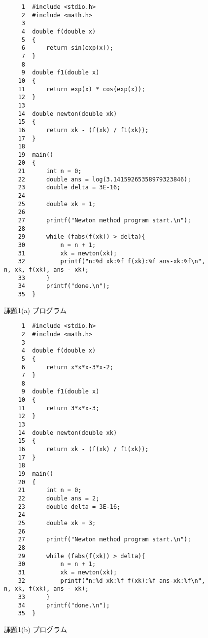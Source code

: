 \documentclass[12pt]{jarticle}
\begin{document}

\begin{figure}[t]
\begin{screen}
\footnotesize
\begin{verbatim}
     1	#include <stdio.h>
     2	#include <math.h> 
     3	
     4	double f(double x)
     5	{
     6	    return sin(exp(x));
     7	}
     8	
     9	double f1(double x)
    10	{
    11	    return exp(x) * cos(exp(x));
    12	}
    13	
    14	double newton(double xk)
    15	{
    16	    return xk - (f(xk) / f1(xk));
    17	}
    18	
    19	main()
    20	{
    21	    int n = 0;
    22	    double ans = log(3.14159265358979323846);
    23	    double delta = 3E-16;
    24	
    25	    double xk = 1;
    26	
    27	    printf("Newton method program start.\n");
    28	
    29	    while (fabs(f(xk)) > delta){
    30	        n = n + 1;
    31	        xk = newton(xk);
    32	        printf("n:%d xk:%f f(xk):%f ans-xk:%f\n", n, xk, f(xk), ans - xk);
    33	    }
    34	    printf("done.\n");
    35	}
\end{verbatim}
\end{screen}
\caption{課題1(a) プログラム}
\label{fig:p1a}
\end{figure}

\begin{figure}[t]
\begin{screen}
\footnotesize
\begin{verbatim}
     1	#include <stdio.h>
     2	#include <math.h> 
     3	
     4	double f(double x)
     5	{
     6	    return x*x*x-3*x-2;
     7	}
     8	
     9	double f1(double x)
    10	{
    11	    return 3*x*x-3;
    12	}
    13	
    14	double newton(double xk)
    15	{
    16	    return xk - (f(xk) / f1(xk));
    17	}
    18	
    19	main()
    20	{
    21	    int n = 0;
    22	    double ans = 2;
    23	    double delta = 3E-16;
    24	
    25	    double xk = 3;
    26	
    27	    printf("Newton method program start.\n");
    28	
    29	    while (fabs(f(xk)) > delta){
    30	        n = n + 1;
    31	        xk = newton(xk);
    32	        printf("n:%d xk:%f f(xk):%f ans-xk:%f\n", n, xk, f(xk), ans - xk);
    33	    }
    34	    printf("done.\n");
    35	}
\end{verbatim}
\end{screen}
\caption{課題1(b) プログラム}
\label{fig:p1b}
\end{figure}
\end{document}
